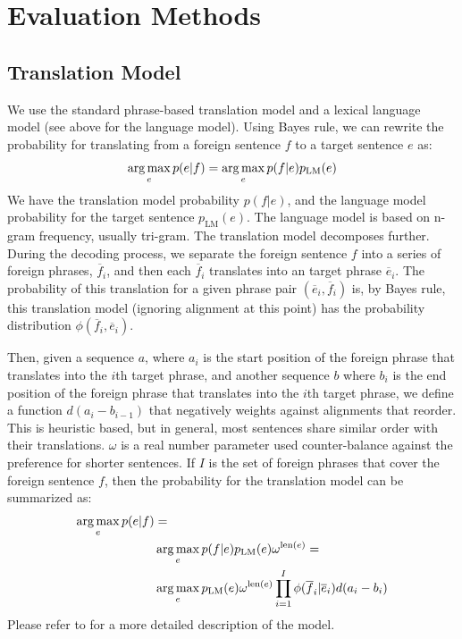 \documentclass[twocolumn]{article}
\begin{document}


\section{Evaluation Methods}
\subsection{Translation Model}
We use the standard phrase-based translation model and a lexical language
model (see above for the language model).
Using Bayes rule, we can rewrite the probability for translating from a
foreign sentence $f$ to a target sentence $e$ as:
\[
  \operatorname*{arg\,max}_e p(e|f) = \operatorname*{arg\,max}_e p(f|e) p_{\text{LM}}(e)
\]
We have the translation model probability $p(f|e)$, and the language model
probability for the target sentence $p_{\text{LM}}(e)$.
The language model is based on n-gram frequency, usually tri-gram.
The translation model decomposes further. During the decoding
process, we separate the foreign sentence $f$ into a series of foreign phrases,
$\overline{f}_i$, and then each $\overline{f}_i$ translates into an target
phrase $\overline{e}_i$. The probability of this translation for a given phrase
pair $(\overline{e}_i, \overline{f}_i)$ is, by Bayes rule, this translation
model (ignoring alignment at this point) has the probability distribution
$\phi(\overline{f}_i, \overline{e}_i)$.


Then, given a sequence $a$, where $a_i$ is the start position of the foreign
phrase that translates into the $i$th target phrase,
and another sequence $b$ where $b_i$ is the end position of the foreign phrase
that translates into the $i$th target phrase,
we define a function $d(a_i - b_{i-1})$ that negatively weights against
alignments that reorder. This is heuristic based, but in general, most sentences
share similar order with their translations. $\omega$ is a real number
parameter used counter-balance against the preference for shorter sentences.
If $I$ is the set of foreign phrases that cover the foreign sentence $f$, then
the probability for the translation model can be summarized as:
\begin{align*}
  \operatorname*{arg\,max}_e p(e|f) & = \\
      & \operatorname*{arg\,max}_e p(f|e) p_{\text{LM}}(e) \omega^{\text{len}(e)} = \\
      & \operatorname*{arg\,max}_e p_{\text{LM}}(e) \omega^{\text{len}(e)}
                  \prod_{i=1}^I \phi(\overline{f}_i | \overline{e}_i)
                              d(a_i - b_{i})
\end{align*}
Please refer to \cite{kom2003} for a more detailed description of the model.
\end{document}
